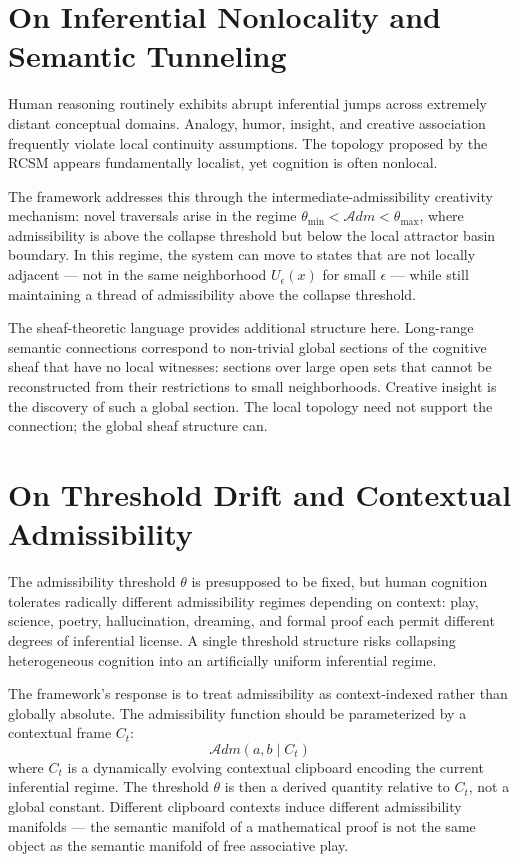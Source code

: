 \documentclass[12pt,oneside]{book}
\theoremstyle{plain}
\theoremstyle{definition}
\theoremstyle{plain}
\begin{document}
\section{On Inferential Nonlocality and Semantic Tunneling}

Human reasoning routinely exhibits abrupt inferential jumps across extremely distant conceptual domains. Analogy, humor, insight, and creative association frequently violate local continuity assumptions. The topology proposed by the RCSM appears fundamentally localist, yet cognition is often nonlocal.

The framework addresses this through the intermediate-admissibility creativity mechanism: novel traversals arise in the regime $\theta_{\min} < \mathcal{A}dm < \theta_{\max}$, where admissibility is above the collapse threshold but below the local attractor basin boundary. In this regime, the system can move to states that are not locally adjacent — not in the same neighborhood $U_\epsilon(x)$ for small $\epsilon$ — while still maintaining a thread of admissibility above the collapse threshold.

The sheaf-theoretic language provides additional structure here. Long-range semantic connections correspond to non-trivial global sections of the cognitive sheaf that have no local witnesses: sections over large open sets that cannot be reconstructed from their restrictions to small neighborhoods. Creative insight is the discovery of such a global section. The local topology need not support the connection; the global sheaf structure can.

\section{On Threshold Drift and Contextual Admissibility}

The admissibility threshold $\theta$ is presupposed to be fixed, but human cognition tolerates radically different admissibility regimes depending on context: play, science, poetry, hallucination, dreaming, and formal proof each permit different degrees of inferential license. A single threshold structure risks collapsing heterogeneous cognition into an artificially uniform inferential regime.

The framework's response is to treat admissibility as context-indexed rather than globally absolute. The admissibility function should be parameterized by a contextual frame $C_t$:
\[
\mathcal{A}dm(a, b \mid C_t)
\]
where $C_t$ is a dynamically evolving contextual clipboard encoding the current inferential regime. The threshold $\theta$ is then a derived quantity relative to $C_t$, not a global constant. Different clipboard contexts induce different admissibility manifolds — the semantic manifold of a mathematical proof is not the same object as the semantic manifold of free associative play.
\end{document}
